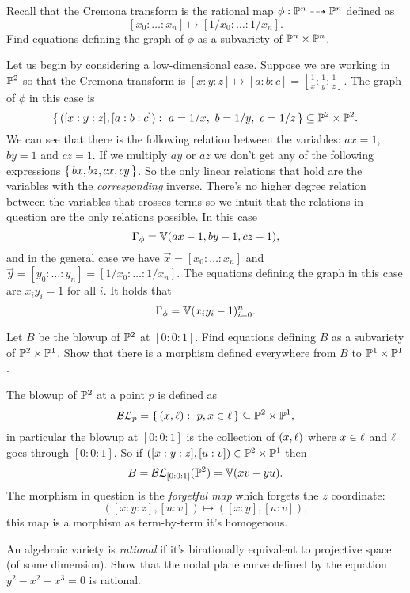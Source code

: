 \documentclass[12pt]{memoir}
\begin{document}
\begin{Ej}
    Recall that the Cremona transform is the rational map $\phi:\mathbb{P}^n\dashrightarrow\mathbb{P}^n$ defined as
    $$[x_0:\dots:x_n]\mapsto[1/x_0:\dots:1/x_n].$$
    Find equations defining the graph of $\phi$ as a subvariety of $\mathbb{P}^n\times\mathbb{P}^n$.
\end{Ej}

\begin{ptcbr}
    Let us begin by considering a low-dimensional case. Suppose we are working in $\mathbb{P}^2$ so that the Cremona transform is $[x:y:z]\mapsto[a:b:c]=[\frac{1}{x}:\frac{1}{y}:\frac{1}{z}]$. The graph of $\phi$ in this case is 
    $$\set{([x:y:z],[a:b:c]):\ a=1/x,\ b=1/y,\ c=1/z}\subseteq\bP^2\x\bP^2.$$
    We can see that there is the following relation between the variables: $ax=1$, $by=1$ and $cz=1$. If we multiply $ay$ or $az$ we don't get any of the following expressions $\{\,bx,bz,cx,cy\,\}$. So the only linear relations that hold are the variables with the \emph{corresponding} inverse. There's no higher degree relation between the variables that crosses terms so we intuit that the relations in question are the only relations possible. In this case 
    $$\Gamma_\phi=\mathbb{V}(ax-1,by-1,cz-1),$$
    and in the general case we have $\vec{x}=[x_0:\dots:x_n]$ and $\vec{y}=[y_0:\dots:y_n]=[1/x_0:\dots:1/x_n]$. The equations defining the graph in this case are $x_iy_i=1$ for all $i$. It holds that 
    $$\Gamma_\phi=\mathbb{V}(x_iy_i-1)_{i=0}^n.$$
\end{ptcbr}
\newpage
\begin{Ej}
    Let $B$ be the blowup of $\mathbb{P}^2$ at $[0:0:1]$. Find equations defining $B$ as a subvariety of $\mathbb{P}^2\times\mathbb{P}^1$. Show that there is a morphism defined everywhere from $B$ to $\mathbb{P}^1\times\mathbb{P}^1$.
\end{Ej}

\begin{ptcbr}
    The blowup of $\mathbb{P}^2$ at a point $p$ is defined as 
    $$\cB\cL_p=\set{(x,\l):\ p,x\in\l}\subseteq \bP^2\x\bP^1,$$
    in particular the blowup at $[0:0:1]$ is the collection of $(x,\ell)$ where $x\in\ell$ and $\ell$ goes through $[0:0:1]$. So if $([x:y:z],[u:v])\in\mathbb{P}^2\times\mathbb{P}^1$  then 
    $$B=\mathcal{B}\mathcal{L}_{[0:0:1]}(\mathbb{P}^2)=\mathbb{V}(xv-yu).$$
    The morphism in question is the \emph{forgetful map} which forgets the $z$ coordinate:
    $$([x:y:z],[u:v])\mapsto([x:y],[u:v]),$$
    this map is a morphism as term-by-term it's homogenous.
\end{ptcbr}
 
\begin{Ej}
    An algebraic variety is \emph{rational} if it's birationally equivalent to projective space (of some dimension). Show that the nodal plane curve defined by the equation $y^2-x^2-x^3=0$ is rational. 
\end{Ej}
\end{document}
